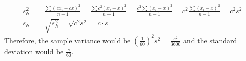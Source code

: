 \documentclass[letterpaper,12pt]{article}
\begin{document}
\begin{enumerate}
\begin{enumerate}
        \begin{align*}
          s_h^2 &= \frac{\sum(cx_i - c\bar{x})^2}{n - 1} = \frac{\sum c^2(x_i - \bar{x})^2}{n - 1} = \frac{c^2 \sum(x_i - \bar{x})^2}{n - 1} = c^2 \frac{\sum(x_i - \bar{x})^2}{n - 1} = c^2s^2 \\
          s_h &= \sqrt{s_h^2} = \sqrt{c^2s^2} = c \cdot s
        \end{align*}
        Therefore, the sample variance would be $(\frac{1}{60})^2 s^2 = \frac{s^2}{3600}$ and the standard deviation would be $\frac{s}{60}$.
    \end{enumerate}
\end{enumerate}
\end{document}
